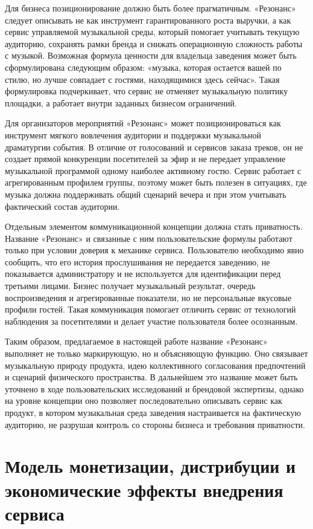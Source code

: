 Для бизнеса позиционирование должно быть более прагматичным. «Резонанс» следует описывать не как инструмент гарантированного роста выручки, а как сервис управляемой музыкальной среды, который помогает учитывать текущую аудиторию, сохранять рамки бренда и снижать операционную сложность работы с музыкой. Возможная формула ценности для владельца заведения может быть сформулирована следующим образом: «музыка, которая остается вашей по стилю, но лучше совпадает с гостями, находящимися здесь сейчас». Такая формулировка подчеркивает, что сервис не отменяет музыкальную политику площадки, а работает внутри заданных бизнесом ограничений.

Для организаторов мероприятий «Резонанс» может позиционироваться как инструмент мягкого вовлечения аудитории и поддержки музыкальной драматургии события. В отличие от голосований и сервисов заказа треков, он не создает прямой конкуренции посетителей за эфир и не передает управление музыкальной программой одному наиболее активному гостю. Сервис работает с агрегированным профилем группы, поэтому может быть полезен в ситуациях, где музыка должна поддерживать общий сценарий вечера и при этом учитывать фактический состав аудитории.

Отдельным элементом коммуникационной концепции должна стать приватность. Название «Резонанс» и связанные с ним пользовательские формулы работают только при условии доверия к механике сервиса. Пользователю необходимо явно сообщить, что его история прослушивания не передается заведению, не показывается администратору и не используется для идентификации перед третьими лицами. Бизнес получает музыкальный результат, очередь воспроизведения и агрегированные показатели, но не персональные вкусовые профили гостей. Такая коммуникация помогает отличить сервис от технологий наблюдения за посетителями и делает участие пользователя более осознанным.

Таким образом, предлагаемое в настоящей работе название «Резонанс» выполняет не только маркирующую, но и объясняющую функцию. Оно связывает музыкальную природу продукта, идею коллективного согласования предпочтений и сценарий физического пространства. В дальнейшем это название может быть уточнено в ходе пользовательских исследований и брендовой экспертизы, однако на уровне концепции оно позволяет последовательно описывать сервис как продукт, в котором музыкальная среда заведения настраивается на фактическую аудиторию, не разрушая контроль со стороны бизнеса и требования приватности.

\section{Модель монетизации, дистрибуции и экономические эффекты внедрения сервиса}
\label{sec:service:monetization}

